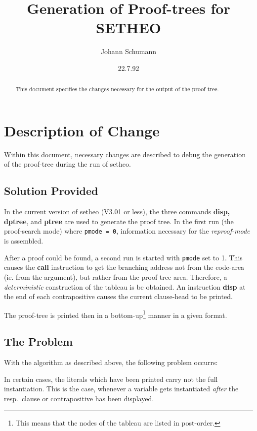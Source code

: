 

\title{Generation of Proof-trees for SETHEO}
\author{Johann Schumann}
\date{22.7.92}



\maketitle

\begin{abstract}
This document specifies the changes necessary for the output of the proof
tree.

\end{abstract}

\section{Description of Change}
Within this document, necessary changes are described to debug the
generation of the proof-tree during the run of setheo.

\subsection{Solution Provided}

In the current version of setheo (V3.01 or less), the three commands
{\bf disp, dptree}, and {\bf ptree} are used to generate the proof
tree. In the first run (the proof-search mode) where {\tt pmode = 0},
information necessary for the {\em reproof-mode}
is assembled.

After a proof could be found, a second run is started with {\tt pmode} set to
1. This causes the {\bf call} instruction to get the branching address
not from the code-area (ie. from the argument), but rather from the proof-tree
area. Therefore, a {\em deterministic} construction of the tableau is be
obtained. An instruction {\bf disp} at the end of each contrapositive
causes the current clause-head to be printed.

The proof-tree is printed then in a bottom-up\footnote{This means
that the nodes of the tableau are listed in post-order.}
manner in a given format.


\subsection{The Problem}
With the algorithm as described above, the following problem occurrs:

In certain cases, the literals which have been printed
carry not the full instantiation.
This is the case, whenever a variable gets instantiated {\em after\/} the
resp.\ clause or contrapositive has been displayed.

